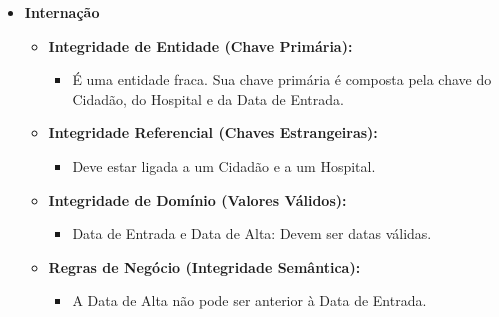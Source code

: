 \documentclass[12pt, a4paper]{article}
\begin{document}
\begin{itemize}
    \item \textbf{Internação}
    \begin{itemize}
        \item \textbf{Integridade de Entidade (Chave Primária):}
        \begin{itemize}
            \item É uma entidade fraca. Sua chave primária é composta pela chave do Cidadão, do Hospital e da Data de Entrada.
        \end{itemize}
        \item \textbf{Integridade Referencial (Chaves Estrangeiras):}
        \begin{itemize}
            \item Deve estar ligada a um Cidadão e a um Hospital.
        \end{itemize}
        \item \textbf{Integridade de Domínio (Valores Válidos):}
        \begin{itemize}
            \item Data de Entrada e Data de Alta: Devem ser datas válidas.
        \end{itemize}
        \item \textbf{Regras de Negócio (Integridade Semântica):}
        \begin{itemize}
            \item A Data de Alta não pode ser anterior à Data de Entrada.
        \end{itemize}
    \end{itemize}


\end{itemize}
\end{document}
